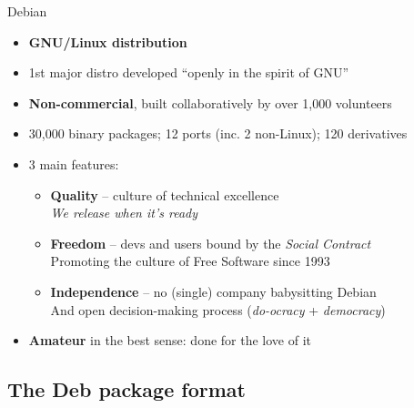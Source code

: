 \documentclass[10pt,final]{beamer}
\begin{document}
\begin{frame}{Debian}
	\begin{itemize}
		\item \textbf{GNU/Linux distribution}
			\br
		\item 1st major distro developed ``openly in the spirit of GNU''
			\br
		\item \textbf{Non-commercial}, built collaboratively by over 1,000 volunteers
			\br
		\item 30,000 binary packages; 12 ports (inc. 2 non-Linux); 120 derivatives
			\br
		\item 3 main features:
			\begin{itemize}
				\item \textbf{Quality} -- culture of technical excellence\\
					{\small\sl We release when it's ready}
					\hbr
				\item \textbf{Freedom} -- devs and users bound by the \textsl{Social Contract}\\
					Promoting the culture of Free Software since 1993
					\hbr
				\item \textbf{Independence} -- no (single) company babysitting Debian\\
					And open decision-making process (\textsl{do-ocracy} + \textsl{democracy})
			\end{itemize}
                        \br
                \item \textbf{Amateur} in the best sense: done for the love of it
	\end{itemize}
\end{frame}



\subsection{The Deb package format}
\end{document}
